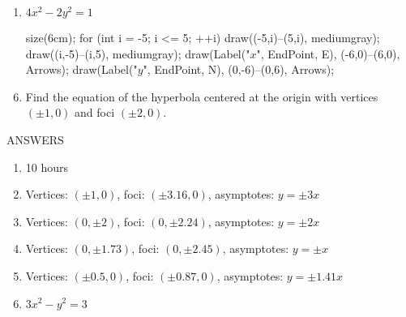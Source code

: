 \documentclass[12pt]{article}
\begin{document}
\begin{multicols}{2}
\begin{enumerate}
	\item $4x^2 - 2 y^2 = 1$ 
	\begin{flushleft}
	\begin{asy}
	size(6cm);
	for (int i = -5; i <= 5; ++i)
	{
    	draw((-5,i)--(5,i), mediumgray);
	    draw((i,-5)--(i,5), mediumgray);
    }
	draw(Label("$x$", EndPoint, E), (-6,0)--(6,0), Arrows);
	draw(Label("$y$", EndPoint, N), (0,-6)--(0,6), Arrows);
	\end{asy}
	\end{flushleft}


\end{enumerate}
\end{multicols}

\bigskip
\bigskip

\begin{enumerate}
\setcounter{enumi}{5}
	\item Find the equation of the hyperbola centered at the origin with vertices $(\pm 1, 0)$
    	and foci $(\pm 2, 0)$.
\end{enumerate}

\newpage

ANSWERS

\begin{multicols}{2}
\begin{enumerate}
	\item 10 hours
 	\item Vertices: $(\pm 1, 0)$, foci: $(\pm 3.16, 0)$, asymptotes: $y = \pm 3x$
	\item Vertices: $(0, \pm 2)$, foci: $(0, \pm 2.24)$, asymptotes: $y = \pm 2x$
	\item Vertices: $(0, \pm 1.73)$, foci: $(0, \pm 2.45)$, asymptotes: $y = \pm x$
	\item Vertices: $(\pm 0.5, 0)$, foci: $(\pm 0.87, 0)$, asymptotes: $y = \pm 1.41x$
    \item $3x^2 - y^2 = 3$
\end{enumerate}
\end{multicols}
\end{document}
